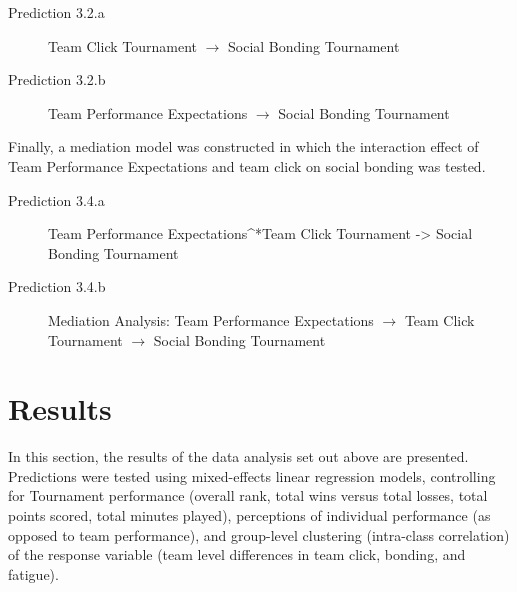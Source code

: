 \documentclass[12pt]{report}
\begin{document}
{\begin{description}
  \item [Prediction 3.2.a] Team Click Tournament $\rightarrow$ Social Bonding Tournament
  \item [Prediction 3.2.b] Team Performance Expectations $\rightarrow$ Social Bonding Tournament
\end{description}
\bigskip
Finally, a mediation model was constructed in which the interaction effect of Team Performance Expectations and team click on social bonding was tested.
\bigskip
\begin{description}
\item[Prediction 3.4.a] Team Performance Expectations^*Team Click Tournament -> Social Bonding Tournament \\
\item[Prediction 3.4.b] Mediation Analysis: Team Performance Expectations $\rightarrow$ Team Click Tournament $\rightarrow$ Social Bonding Tournament
\end{description}
\clearpage



















\section{Results}

In this section, the results of the data analysis set out above are presented. Predictions were tested using mixed-effects linear regression models, controlling for Tournament performance (overall rank, total wins versus total losses, total points scored, total minutes played), perceptions of individual performance (as opposed to team performance), and group-level clustering (intra-class correlation) of the response variable (team level differences in team click, bonding, and fatigue). \\

}
\end{document}
